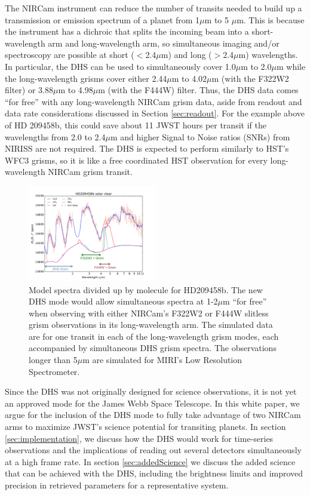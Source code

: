 \documentclass{emulateapj}
\begin{document}
The NIRCam instrument can reduce the number of transits needed to build up a transmission or emission spectrum of a planet from 1$\mu$m to 5 $\mu$m. This is because the instrument has a dichroic that splits the incoming beam into a short-wavelength arm and long-wavelength arm, so simultaneous imaging and/or spectroscopy are possible at short ($<$2.4$\mu$m) and long ($>$2.4$\mu$m) wavelengths. In particular, the DHS can be used to simultaneously cover 1.0$\mu$m to 2.0$\mu$m while the long-wavelength grisms cover either 2.44$\mu$m to 4.02$\mu$m (with the F322W2 filter) or 3.88$\mu$m to 4.98$\mu$m (with the F444W) filter. Thus, the DHS data comes ``for free'' with any long-wavelength NIRCam grism data, aside from readout and data rate considerations discussed in Section \ref{sec:readout}. For the example above of HD 209458b, this could save about 11 JWST hours per transit if the wavelengths from 2.0 to 2.4$\mu$m and higher Signal to Noise ratios (SNRs) from NIRISS are not required. The DHS is expected to perform similarly to HST's WFC3 grisms, so it is like a free coordinated HST observation for every long-wavelength NIRCam grism transit.

\begin{figure}[!ht]
\includegraphics[width=0.5\textwidth]{molecules_DHS_HD209.pdf}
\caption{Model spectra divided up by molecule for HD209458b. The new DHS mode would allow simultaneous spectra at 1-2$\mu$m ``for free'' when observing with either NIRCam's F322W2 or F444W slitless grism observations in its long-wavelength arm. The simulated data are for one transit in each of the long-wavelength grism modes, each accompanied by simultaneous DHS grism spectra. The observations longer than 5$\mu$m are simulated for MIRI's Low Resolution Spectrometer.}\label{fig:DHSmolecules}
\end{figure}

Since the DHS was not originally designed for science observations, it is not yet an approved mode for the James Webb Space Telescope. In this white paper, we argue for the inclusion of the DHS mode to fully take advantage of two NIRCam arms to maximize JWST's science potential for transiting planets. In section \ref{sec:implementation}, we discuss how the DHS would work for time-series observations and the implications of reading out several detectors simultaneously at a high frame rate. In section \ref{sec:addedScience} we discuss the added science that can be achieved with the DHS, including the brightness limits and improved precision in retrieved parameters for a representative system.
\end{document}
